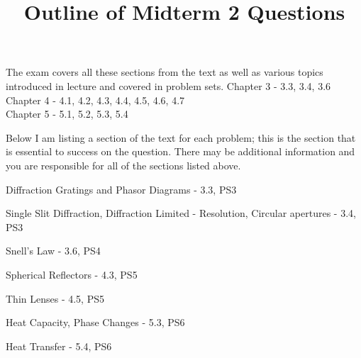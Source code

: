 \documentclass[10pt]{article}
\newenvironment{problem}[2][Problem]{\begin{trivlist}
\item[\hskip \labelsep {\bfseries #1}\hskip \labelsep {\bfseries #2.}]}{\end{trivlist}}
\begin{document}
 \title{Outline of Midterm 2 Questions}
\date{}
\maketitle

\noindent
The exam covers all these sections from the text as well as various topics introduced in lecture and covered in problem sets.
Chapter 3 - 3.3, 3.4, 3.6\\
Chapter 4 - 4.1, 4.2, 4.3, 4.4, 4.5, 4.6, 4.7\\
Chapter 5 - 5.1, 5.2, 5.3, 5.4

Below I am listing a section of the text for each problem; this is the section that is essential to success on the question. There may be additional information and you are responsible for all of the sections listed above.

\begin{problem}{1} Diffraction Gratings and Phasor Diagrams - 3.3, PS3
\end{problem}

\begin{problem}{2} Single Slit Diffraction, Diffraction Limited - Resolution, Circular apertures - 3.4, PS3
\end{problem}

\begin{problem}{3} Snell's Law - 3.6, PS4
\end{problem}

\begin{problem}{4} Spherical Reflectors - 4.3, PS5
\end{problem}

\begin{problem}{5} Thin Lenses - 4.5, PS5
\end{problem}

\begin{problem}{6} Heat Capacity, Phase Changes - 5.3, PS6
\end{problem}

\begin{problem}{7} Heat Transfer - 5.4, PS6
\end{problem}

\end{document}
